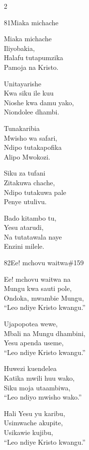 \begin{multicols}{2}
\begin{hymn}{81}{Miaka michache}{}
\begin{stanza}
Miaka michache\\
Iliyobakia,\\
Halafu tutapumzika\\
Pamoja na Kristo.
\end{stanza}
\begin{chorus}
Unitayarishe\\
Kwa siku ile kuu\\
Nioshe kwa damu yako,\\
Niondolee dhambi.
\end{chorus}
\begin{stanza}
Tunakaribia\\
Mwisho wa safari,\\
Ndipo tutakapofika\\
Alipo Mwokozi.
\end{stanza}
\begin{stanza}
Siku za tufani\\
Zitakuwa chache,\\
Ndipo tutakuwa pale\\
Penye utulivu.
\end{stanza}
\begin{stanza}
Bado kitambo tu,\\
Yesu atarudi,\\
Na tutatawala naye\\
Enzini milele.
\end{stanza}
\end{hymn}

\begin{hymn}{82}{Ee! mchovu waitwa}{\#159}
\begin{stanza}
Ee! mchovu waitwa na\\
Mungu kwa sauti pole,\\
Ondoka, mwambie Mungu,\\
``Leo ndiye Kristo kwangu.''
\end{stanza}
\begin{stanza}
Ujapopotea wewe,\\
Mbali na Mungu dhambini,\\
Yesu apenda useme,\\
``Leo ndiye Kristo kwangu.''
\end{stanza}
\begin{stanza}
Huwezi kuendelea\\
Katika mwili huu wako,\\
Siku moja utaambiwa,\\
``Leo ndiyo mwisho wako.''
\end{stanza}
\begin{stanza}
Hali Yesu yu karibu,\\
Usimwache akupite,\\
Usikawie kujibu,\\
``Leo ndiye Kristo kwangu.''
\end{stanza}
\end{hymn}


\end{multicols}
